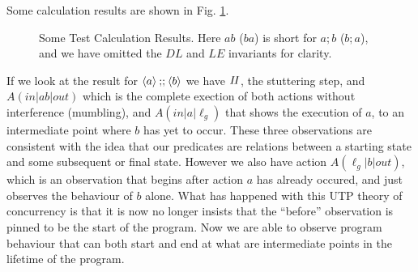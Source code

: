 Some calculation results are shown in Fig. \ref{fig:calc-results}.
\begin{figure}[t]
\caption{
  Some Test Calculation Results.
  Here $ab$ ($ba$) is short for $a;b$ ($b;a$), and we have omitted
  the $DL$ and $LE$ invariants for clarity.
}
\label{fig:calc-results}
\end{figure}
If we look at the result for $\langle a\rangle \mathbin{;\!;} \langle b\rangle$
we have $\mathit{II}$, the stuttering step,
and $A(in|ab|out)$ which is
the complete exection of both actions without interference (mumbling),
and $A(in|a|\ell_g)$ that shows the execution of $a$, to an intermediate
point where $b$ has yet to occur.
These three observations are consistent with the idea that
our predicates are relations between a starting state and some subsequent
or final state.
However we also have action $A(\ell_g|b|out)$,
which is an observation that begins after action $a$ has already occured,
and just observes the behaviour of $b$ alone.
What has happened with this UTP theory of concurrency
is that it is now no longer insists that the ``before'' observation
is pinned to be the start of the program. Now we are able to observe program
behaviour that can both start and end at what are intermediate points
in the lifetime of the program.

